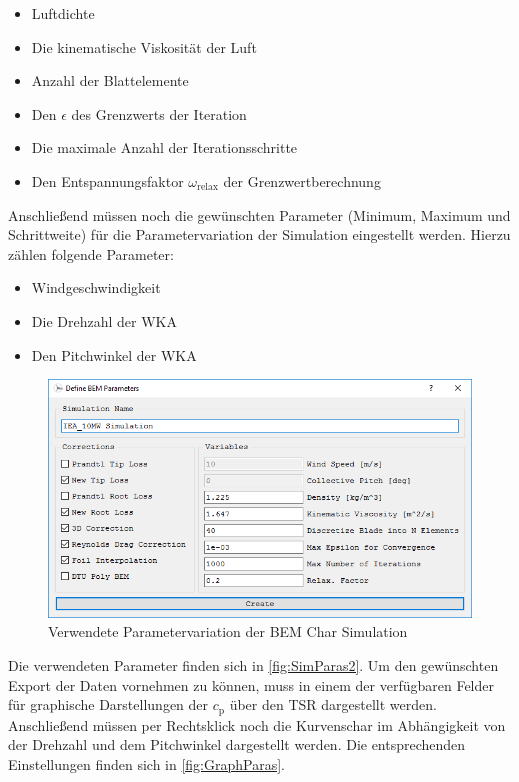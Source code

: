 \begin{itemize}
	\item Luftdichte
	\item Die kinematische Viskosität der Luft
	\item Anzahl der Blattelemente
	\item Den $\epsilon$ des Grenzwerts der Iteration
	\item Die maximale Anzahl der Iterationsschritte
	\item Den Entspannungsfaktor $\omega_{\text{relax}}$ der Grenzwertberechnung
\end{itemize}

Anschließend müssen noch die gewünschten Parameter (Minimum, Maximum und Schrittweite) für die Parametervariation der Simulation eingestellt werden. Hierzu zählen folgende Parameter:

\begin{itemize}
	\item Windgeschwindigkeit
	\item Die Drehzahl der \gls{WKA}
	\item Den Pitchwinkel der \gls{WKA}
\end{itemize}

\begin{figure}[H]
    \centering
    \includegraphics[width=\textwidth]{Bilder/QBlade_CharBEM_SimParas}
    \caption{Verwendete Parametervariation der BEM Char Simulation}\label{fig:SimParas2}
\end{figure}

Die verwendeten Parameter finden sich in \autoref{fig:SimParas2}. Um den gewünschten Export der Daten vornehmen zu können, muss in einem der verfügbaren Felder für graphische Darstellungen der $c_\text{p}$ über den \gls{TSR} dargestellt werden. Anschließend müssen per Rechtsklick noch die Kurvenschar im Abhängigkeit von der Drehzahl und dem Pitchwinkel dargestellt werden. Die entsprechenden Einstellungen finden sich in \autoref{fig:GraphParas}.

